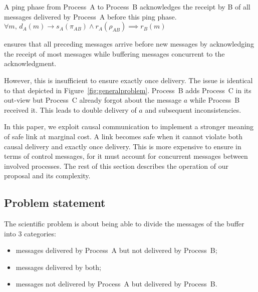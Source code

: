 \begin{lemma}
  A ping phase from Process~A to Process~B acknowledges the receipt by B of all
  messages delivered by Process~A before this ping phase.
  $\forall m,\, d_A(m) \rightarrow s_A(\pi_{AB}) \wedge r_A(\rho_{AB}) \implies
  r_B(m)$
\end{lemma}

\PCBROADCAST ensures that all preceding messages arrive before new messages by
acknowledging the receipt of most messages while buffering messages concurrent
to the acknowledgment.



However, this is insufficient to ensure exactly once delivery. The issue is
identical to that depicted in Figure~\ref{fig:generalproblem}. Process~B adds
Process~C in its out-view but Process~C already forgot about the message $a$
while Process~B received it. This leads to double delivery of $a$ and subsequent
inconsistencies.

In this paper, we exploit causal communication to implement a stronger meaning
of safe link at marginal cost. A link becomes safe when it cannot violate both
causal delivery and exactly once delivery.  This is more expensive to ensure in
terms of control messages, for it must account for concurrent messages between
involved processes. The rest of this section describes the operation of our
proposal and its complexity.


\subsection{Problem statement}

The scientific problem is about being able to divide the messages of the buffer
into 3 categories:
\begin{itemize}
\item messages delivered by Process~A but not delivered by Process~B;
\item messages delivered by both;
\item messages not delivered by Process~A but delivered by Process~B.
\end{itemize}


